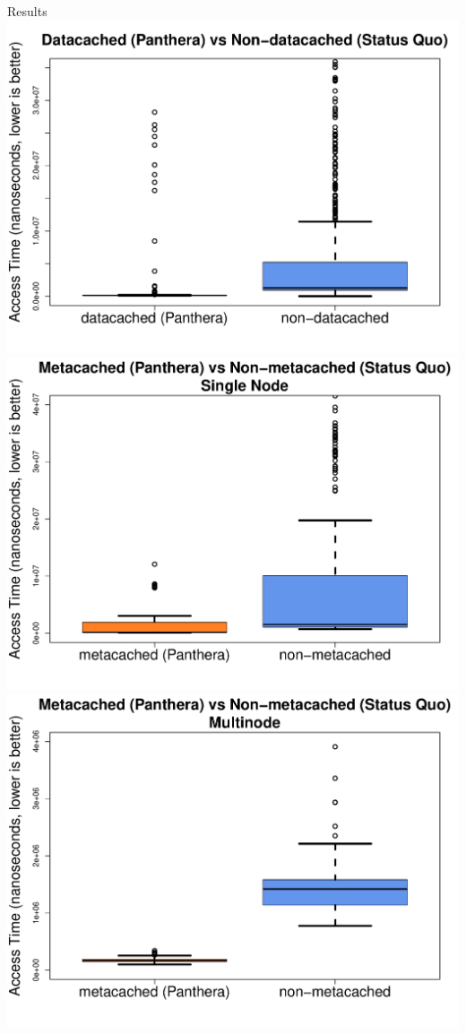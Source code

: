 \documentclass[final]{beamer} %
\begin{document}
\begin{frame}
\begin{columns}[t]
\begin{column}{0.32\textwidth}
	\begin{block}{Results}
		\includegraphics[scale=1.08]{assets/box-plot-data-larger.pdf}
		\vspace{1em}
		\includegraphics[scale=1.08]{assets/box-plot-metadata-larger.pdf}
		\vspace{1em}
		\includegraphics[scale=1.08]{assets/box-plot-meta-multinode-larger.pdf}
	\end{block}


\end{column}
\end{columns}
\end{frame}
\end{document}
